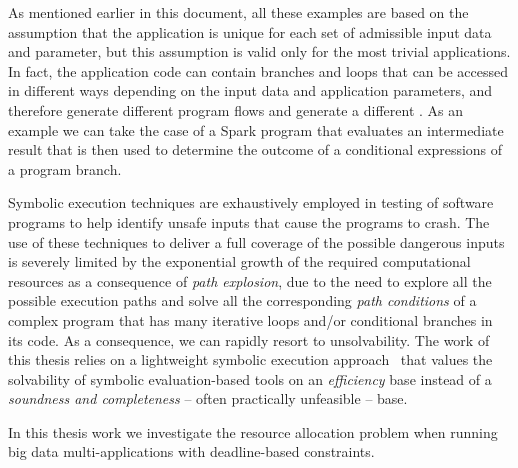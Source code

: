 As mentioned earlier in this document, all these examples are based on the assumption that the application \plan is unique for each set of admissible input data and parameter, but this assumption is valid only for the most trivial applications. In fact, the application code can contain branches and loops that can be accessed in different ways depending on the input data and application parameters, and therefore generate different program flows and generate a different \plan. As an example we can take the case of a Spark program that evaluates an intermediate result that is then used to determine the outcome of a conditional expressions of a program branch.

Symbolic execution techniques are exhaustively employed in testing of software programs to help identify unsafe inputs that cause the programs to crash. The use of these techniques to deliver a  full coverage of the possible dangerous inputs is severely limited by the exponential growth of the required computational resources as a consequence of \textit{path explosion}, due to the need to explore all the possible execution paths and solve all the corresponding \textit{path conditions} of a complex program that has many iterative loops and/or conditional branches in its code. As a consequence, we can rapidly resort to unsolvability. The work of this thesis relies on a lightweight symbolic execution  approach~\cite{Baresi-Quattrocchi-Denaro:2019} that values the solvability of symbolic evaluation-based tools on an \textit{efficiency} base instead of a \textit{soundness and completeness} -- often practically unfeasible -- base.

In this thesis work we investigate the resource allocation problem when running big data multi-\plan applications with deadline-based \qos constraints. 


